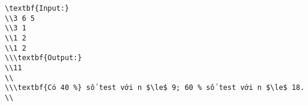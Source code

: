 \begin{verbatim}
\textbf{Input:}
\\3 6 5
\\3 1
\\1 2
\\1 2
\\\textbf{Output:}
\\11
\\
\\\textbf{Có 40 %} số test với n $\le$ 9; 60 % số test với n $\le$ 18.
\\\end{verbatim}
